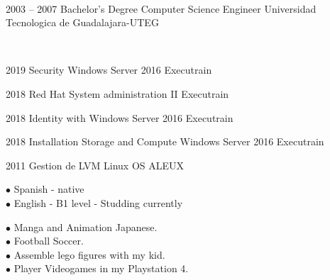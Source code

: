 \documentclass[9pt]{developercv} %
\begin{document}

\\

\begin{entrylist}
	\entry
		{2003 -- 2007}
		{Bachelor's Degree}
		{Computer Science Engineer}
		{Universidad Tecnologica de Guadalajara-UTEG}
\end{entrylist}

\\

\begin{entrylist}
	\entry
		{2019}
		{Security Windows Server 2016}
		{Executrain}
		{}
\end{entrylist}

\begin{entrylist}
	\entry
	{2018}
	{Red Hat System administration II}
	{Executrain}
	{}
\end{entrylist}

\begin{entrylist}
	\entry
	{2018}
	{Identity with Windows Server 2016}
	{Executrain}
	{}
\end{entrylist}


\begin{entrylist}
	\entry
	{2018}
	{Installation Storage and Compute Windows Server 2016}
	{Executrain}
	{}
\end{entrylist}

\begin{entrylist}
	\entry
	{2011}
	{Gestion de LVM Linux OS}
	{ALEUX}
	{}
\end{entrylist}



\begin{minipage}[t]{0.4\textwidth}	
	\vspace{-\baselineskip} %

	$\bullet$ {Spanish} - native\\
	$\bullet$ {English} - B1 level - Studding currently\\


	\vspace{-\baselineskip} %

		$\bullet$ Manga and Animation Japanese.\\
		$\bullet$ Football Soccer.\\  
		$\bullet$ Assemble lego figures with my kid.\\ 
		$\bullet$ Player Videogames in my Playstation 4.

\end{minipage}

\end{document}
